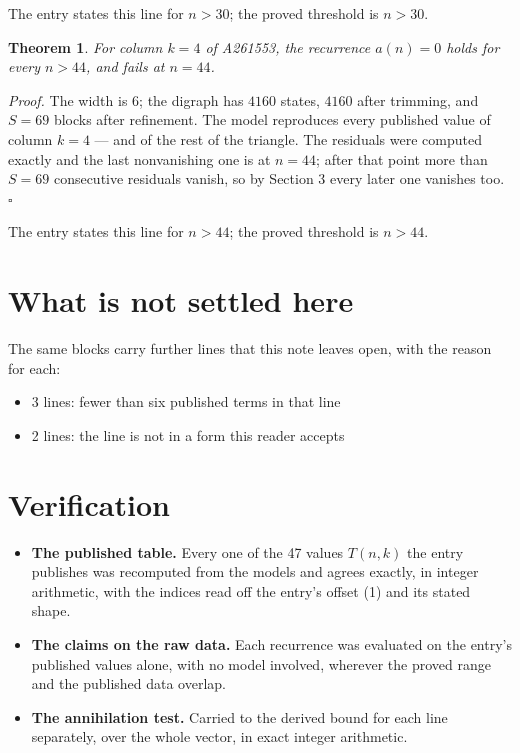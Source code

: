 \documentclass[11pt]{article}
\newtheorem{theorem}{Theorem}
\theoremstyle{definition}
\begin{document}
The entry states this line for $n > 30$; the proved threshold is $n > 30$.

\begin{theorem} For column $k = 4$ of A261553, the recurrence $a(n) = 0$ holds for every $n > 44$, and fails at $n = 44$.\end{theorem}

{\itshape Proof.} The width is $6$; the digraph has $4160$ states, $4160$ after trimming, and $S = 69$ blocks after refinement. The model reproduces every published value of column $k = 4$ --- and of the rest of the triangle. The residuals were computed exactly and the last nonvanishing one is at $n = 44$; after that point more than $S = 69$ consecutive residuals vanish, so by Section 3 every later one vanishes too. $\square$

The entry states this line for $n > 44$; the proved threshold is $n > 44$.

\section{What is not settled here}

The same blocks carry further lines that this note leaves open, with the reason for each:

\begin{itemize}

\item 3 lines: fewer than six published terms in that line

\item 2 lines: the line is not in a form this reader accepts

\end{itemize}

\section{Verification}

\begin{itemize}

\item {\bfseries The published table.} Every one of the 47 values $T(n,k)$ the entry publishes was recomputed from the models and agrees exactly, in integer arithmetic, with the indices read off the entry's offset (1) and its stated shape.

\item {\bfseries The claims on the raw data.} Each recurrence was evaluated on the entry's published values alone, with no model involved, wherever the proved range and the published data overlap.

\item {\bfseries The annihilation test.} Carried to the derived bound for each line separately, over the whole vector, in exact integer arithmetic.

\end{itemize}
\end{document}
